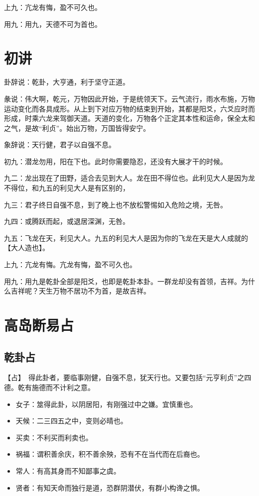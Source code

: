 \documentclass[12pt,oneside]{book}
\begin{document}
上九：亢龙有悔，盈不可久也。

用九：用九，天德不可为首也。


\section{初讲}
卦辞说：乾卦，大亨通，利于坚守正道。

彖说：伟大啊，乾元，万物因此开始，于是统领天下。云气流行，雨水布施，万物运动变化而各具成形。从上到下对应万物的结束到开始，其都是阳爻，六爻应时而形成，时乘六龙来驾御天道。天道的变化，万物各个正定其本性和运命，保全太和之气，是故“利贞”。始出万物，万国皆得安宁。

象辞说：天行健，君子以自强不息。

初九：潜龙勿用，阳在下也。此时你需要隐忍，还没有大展才干的时候。

九二：龙出现在了田野，适合去见到大人。龙在田不得位也。此利见大人是因为龙不得位，和九五的利见大人是有区别的，

九三：君子终日自强不息，到了晚上也不放松警惕如入危险之境，无咎。

九四：或腾跃而起，或退居深渊，无咎。

九五：飞龙在天，利见大人。九五的利见大人是因为你的飞龙在天是大人成就的【大人造也】。

上九：亢龙有悔。亢龙有悔，盈不可久也。

用九：用九是乾卦全部是阳爻，也即是乾卦本卦。一群龙却没有首领，吉祥。为什么吉祥呢？天生万物不居功不为首，是故吉祥。


\section{高岛断易占}
\subsection{乾卦占}
【占】　得此卦者，要临事刚健，自强不息，犹天行也。又要包括“元亨利贞”之四德。乾有施德而不计利之意。

\begin{itemize}
\item 女子：筮得此卦，以阴居阳，有刚强过中之嫌。宜慎重也。
\item 天候：二三四五之中，变则必晴也。
\item 买卖：不利买而利卖也。
\item 祸福：谓积善余庆，积不善余殃，恐有不在当代而在后裔也。
\item 常人：有高其身而不知鄙事之虞。
\item 贤者：有知天命而独行是道，恐群阴潜伏，有群小构谗之惧。
\end{itemize}
\end{document}
